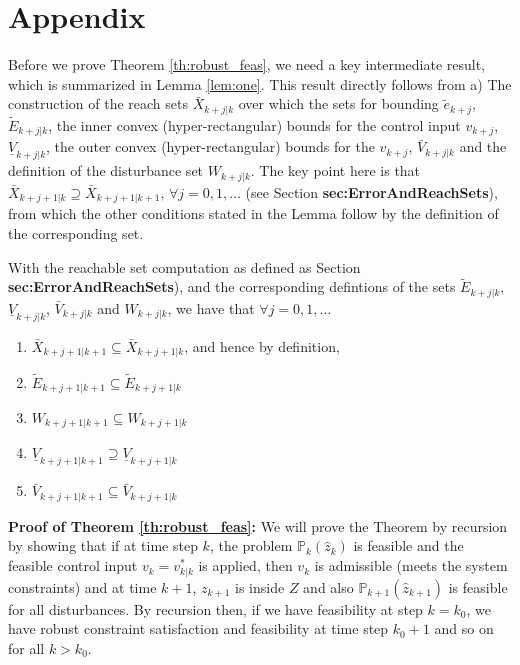 \section*{Appendix}

Before we prove Theorem \ref{th:robust_feas}, we need a key intermediate result, which is summarized in Lemma \ref{lem:one}. This result directly follows from a) The construction of the reach sets $\bar{X}_{k+j|k}$ over which the sets for bounding $\tilde{e}_{k+j}$, $\tilde{E}_{k+j|k}$, the inner convex (hyper-rectangular) bounds for the control input $v_{k+j}$, $\underline{V}_{k+j|k}$, the outer convex (hyper-rectangular) bounds for the  $v_{k+j}$, $\bar{V}_{k+j|k}$ and the definition of the disturbance set $W_{k+j|k}$. The key point here is that $\bar{X}_{k+j+1|k} \supseteq \bar{X}_{k+j+1|k+1}, \, \forall j=0,1,\dotsc$ (see Section \textbf{sec:ErrorAndReachSets}), from which the other conditions stated in the Lemma follow by the definition of the corresponding set.

\begin{lemma}
\label{lem:one}
With the reachable set computation as defined as Section \textbf{sec:ErrorAndReachSets}), and the corresponding defintions of the sets $\tilde{E}_{k+j|k}$, $\underline{V}_{k+j|k}$, $\bar{V}_{k+j|k}$ and $W_{k+j|k}$, we have that $\forall j=0,1,\dotsc$
\begin{enumerate}
\item $\bar{X}_{k+j+1|k+1} \subseteq \bar{X}_{k+j+1|k}$, and hence by definition,
\item $\tilde{E}_{k+j+1|k+1} \subseteq \tilde{E}_{k+j+1|k}$
\item ${W}_{k+j+1|k+1} \subseteq {W}_{k+j+1|k}$
\item $\underline{V}_{k+j+1|k+1} \supseteq \underline{V}_{k+j+1|k}$
\item $\bar{V}_{k+j+1|k+1} \subseteq \bar{V}_{k+j+1|k}$
\end{enumerate}
\end{lemma} 

\textbf{Proof of Theorem \ref{th:robust_feas}:} We will prove the Theorem by recursion by showing that if at time step $k$, the problem $\mathbb{P}_{k}(\hat{z}_k)$ is feasible and the feasible control input $v_k = v^{*}_{k|k}$ is applied, then $v_k$ is admissible (meets the system constraints) and at time $k+1$, $z_{k+1}$ is inside $Z$ and also $\mathbb{P}_{k+1}(\hat{z}_{k+1})$ is feasible for all disturbances. By recursion then, if we have feasibility at step $k=k_0$, we have robust constraint satisfaction and feasibility at time step $k_0+1$ and so on for all $k>k_0$. 

